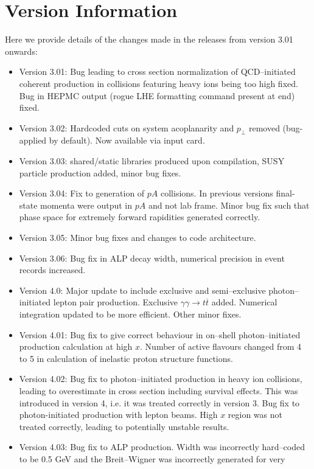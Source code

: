 \documentclass[12pt]{article}
\begin{document}
\section{Version Information}

Here we provide details of the changes made in the releases from version 3.01 onwards:

\begin{itemize}

\item Version 3.01: Bug leading to cross section normalization of QCD--initiated coherent production in collisions featuring heavy ions being too 
high fixed. Bug in HEPMC output (rogue LHE formatting command present at end) fixed.
\item Version 3.02: Hardcoded cuts on system acoplanarity and $p_\perp$ removed (bug- applied by default). Now available via input card.
\item Version 3.03: shared/static libraries produced upon compilation, SUSY particle production added, minor bug fixes.
\item Version 3.04: Fix to generation of $pA$ collisions. In previous versions final-state momenta were output in $pA$ and not lab frame. Minor bug 
fix such that phase space for extremely forward rapidities generated correctly.
\item Version 3.05: Minor bug fixes and changes to code architecture.
\item Version 3.06: Bug fix in ALP decay width, numerical precision in event records increased.
\item Version 4.0: Major update to include exclusive and semi--exclusive photon--initiated lepton pair production. Exclusive 
$\gamma\gamma \to t\overline{t}$ added. Numerical integration updated to be more efficient. Other minor fixes.
\item Version 4.01: Bug fix to give correct behaviour in on--shell photon--initiated production calculation at high $x$. Number of active flavours 
changed from 4 to 5 in calculation of inelastic proton structure functions.
\item Version 4.02: Bug fix to photon--initiated production in heavy ion collisions, leading to overestimate in cross section including survival effects.
 This was introduced in version 4, i.e. it was treated correctly in version 3. Bug fix to photon-initiated production with lepton beams. High $x$ region 
 was not treated correctly, leading to potentially unstable results.
\item Version 4.03: Bug fix to ALP production. Width was incorrectly hard--coded to be 0.5 GeV and the Breit--Wigner was incorrectly generated for very 

\end{itemize}
\end{document}
